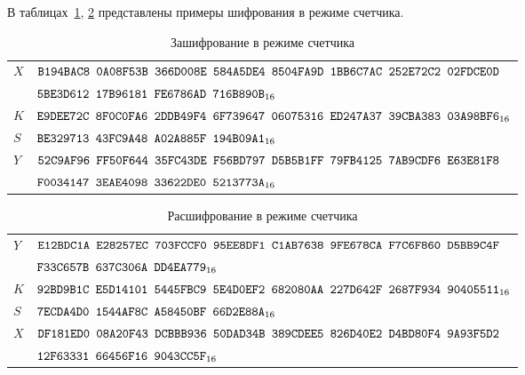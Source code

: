 \label{TEST.CTR}

В таблицах~\ref{Table.TEST.CTRE}, \ref{Table.TEST.CTRD} 
представлены примеры шифрования в режиме счетчика.

\begin{table}[H]
\caption{Зашифрование в режиме счетчика}\label{Table.TEST.CTRE}
\begin{tabular}{|l|l|}
\hline
$X$ &
$\texttt{B194BAC8~0A08F53B~366D008E~584A5DE4~8504FA9D~1BB6C7AC~252E72C2~02FDCE0D}$\\
&
$\texttt{5BE3D612~17B96181~FE6786AD~716B890B}_{16}$\\
\hline
$K$ & 
$\texttt{E9DEE72C~8F0C0FA6~2DDB49F4~6F739647~06075316~ED247A37~39CBA383~03A98BF6}_{16}$\\
\hline
$S$ & 
$\texttt{BE329713~43FC9A48~A02A885F~194B09A1}_{16}$\\
\dhline
$Y$ &
$\texttt{52C9AF96~FF50F644~35FC43DE~F56BD797~D5B5B1FF~79FB4125~7AB9CDF6~E63E81F8}$\\
&
$\texttt{F0034147~3EAE4098~33622DE0~5213773A}_{16}$\\
\hline
\end{tabular}
\end{table}

\begin{table}[H]
\caption{Расшифрование в режиме счетчика}\label{Table.TEST.CTRD}
\begin{tabular}{|l|l|}
\hline
$Y$ &
$\texttt{E12BDC1A~E28257EC~703FCCF0~95EE8DF1~C1AB7638~9FE678CA~F7C6F860~D5BB9C4F}$\\
& 
$\texttt{F33C657B~637C306A~DD4EA779}_{16}$\\
\hline
$K$ & 
$\texttt{92BD9B1C~E5D14101~5445FBC9~5E4D0EF2~682080AA~227D642F~2687F934~90405511}_{16}$\\
\hline
$S$ & 
$\texttt{7ECDA4D0~1544AF8C~A58450BF~66D2E88A}_{16}$\\
\dhline
$X$ &
$\texttt{DF181ED0~08A20F43~DCBBB936~50DAD34B~389CDEE5~826D40E2~D4BD80F4~9A93F5D2}$\\
&
$\texttt{12F63331~66456F16~9043CC5F}_{16}$\\
\hline
\end{tabular}
\end{table}
